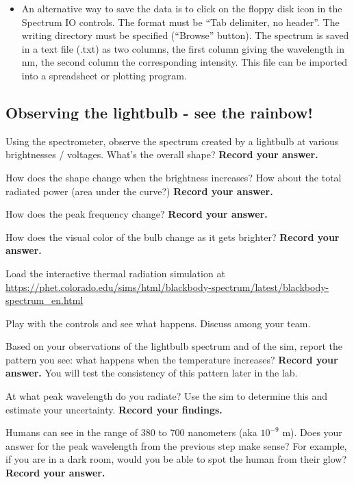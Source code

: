 \begin{itemize}
\begin{itemize}
	\item An alternative way to save the data is to click on the floppy disk icon in the
	Spectrum IO controls. The format must be ``Tab delimiter, no header''. The
	writing directory must be specified (``Browse'' button). The spectrum is saved in a
	text file (.txt) as two columns, the first column giving the wavelength in nm, the
	second column the corresponding intensity. This file can be imported into a spreadsheet or plotting program.
	\end{itemize}
\end{itemize}

\subsection{Observing the lightbulb - see the rainbow!}\label{ic:sec:exploring}

\begin{steps}
	
	\item Using the spectrometer, observe the spectrum created by a lightbulb at various brightnesses / voltages.  What's the overall shape? \textbf{Record your answer.}
	
	\item How does the shape change when the brightness increases? How about the total radiated power (area under the curve?) \textbf{Record your answer.}
	
	\item How does the peak frequency change? \textbf{Record your answer.}
	
	\item How does the visual color of the bulb change as it gets brighter? \textbf{Record your answer.}

	\item \item\label{ic:step:load-sim} Load the interactive thermal radiation simulation
	at
	\url{https://phet.colorado.edu/sims/html/blackbody-spectrum/latest/blackbody-spectrum_en.html}
	
	\item Play with the controls and see what happens. Discuss among your team.
	
	\item\label{ic:step:pattern} Based on your observations of the lightbulb spectrum and of the sim, report the pattern you see: what happens when the temperature increases? \textbf{Record your answer.} You will test the consistency of this pattern later in the lab.
	
	\item At what peak wavelength do you radiate? Use the sim to determine this and 
	estimate your uncertainty. \textbf{Record your findings.}
	
	\item Humans can see in the range of 380 to 700 nanometers (aka $10^{-9}$ m). Does your answer for the peak wavelength from the previous step make sense? For example, if you are in a dark room, would you be able to spot the human from their glow? \textbf{Record your answer.}

\end{steps}

